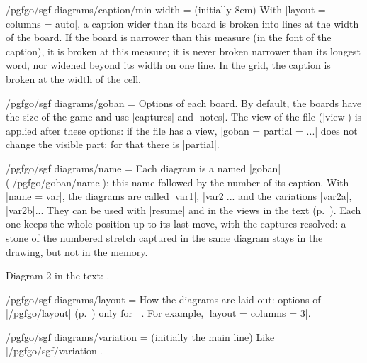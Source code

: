 \begin{key}{/pgfgo/sgf diagrams/caption/min width =  (initially 8em)}
	With |layout = {columns = auto}|, a caption wider than its board is broken into lines at the width of the board. If the board is narrower than this measure (in the font of the caption), it is broken at this measure; it is never broken narrower than its longest word, nor widened beyond its width on one line. In the grid, the caption is broken at the width of the cell.
\end{key}

\begin{key}{/pgfgo/sgf diagrams/goban = }
	Options of each board. By default, the boards have the size of the game and use |captures| and |notes|. The view of the file (|view|) is applied after these options: if the file has a view, |goban = {partial = ...}| does not change the visible part; for that there is |partial|.
\end{key}

\begin{key}{/pgfgo/sgf diagrams/name = }
	Each diagram is a named |goban| (|/pgfgo/goban/name|): this name followed by the number of its caption. With |name = var|, the diagrams are called |var1|, |var2|... and the variations |var2a|, |var2b|... They can be used with |resume| and in the views in the text (p.~\pageref{subsec:vistas}). Each one keeps the whole position up to its last move, with the captures resolved: a stone of the numbered stretch captured in the same diagram stays in the drawing, but not in the memory.

	\begin{codeexample}[]

		Diagram 2 in the text: .
	\end{codeexample}
\end{key}

\begin{key}{/pgfgo/sgf diagrams/layout = }
	How the diagrams are laid out: options of |/pgfgo/layout| (p.~\pageref{subsec:disposicion}) only for |\sgfdiagrams|. For example, |layout = {columns = 3}|.
\end{key}

\begin{key}{/pgfgo/sgf diagrams/variation =  (initially the main line)}
	Like |/pgfgo/sgf/variation|.
\end{key}

